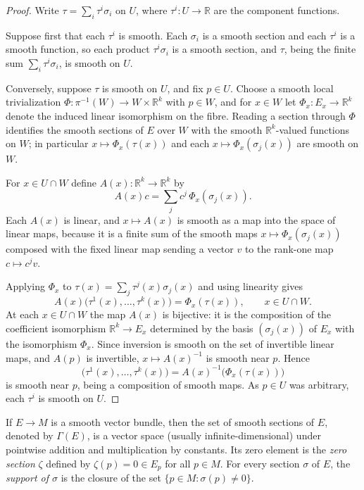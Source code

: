 \begin{proof}
\leanok
Write $\tau = \sum_i \tau^i \sigma_i$ on $U$, where $\tau^i : U \to \mathbb{R}$ are the component
functions.

Suppose first that each $\tau^i$ is smooth. Each $\sigma_i$ is a smooth section and each $\tau^i$
is a smooth function, so each product $\tau^i \sigma_i$ is a smooth section, and $\tau$, being the
finite sum $\sum_i \tau^i \sigma_i$, is smooth on $U$.

Conversely, suppose $\tau$ is smooth on $U$, and fix $p \in U$. Choose a smooth local
trivialization $\Phi : \pi^{-1}(W) \to W \times \mathbb{R}^k$ with $p \in W$, and for $x \in W$ let
$\Phi_x : E_x \to \mathbb{R}^k$ denote the induced linear isomorphism on the fibre. Reading a
section through $\Phi$ identifies the smooth sections of $E$ over $W$ with the smooth
$\mathbb{R}^k$-valued functions on $W$; in particular $x \mapsto \Phi_x(\tau(x))$ and each
$x \mapsto \Phi_x(\sigma_j(x))$ are smooth on $W$.

For $x \in U \cap W$ define $A(x) : \mathbb{R}^k \to \mathbb{R}^k$ by
\[
  A(x)c = \sum_j c^j \, \Phi_x(\sigma_j(x)).
\]
Each $A(x)$ is linear, and $x \mapsto A(x)$ is smooth as a map into the space of linear maps,
because it is a finite sum of the smooth maps $x \mapsto \Phi_x(\sigma_j(x))$ composed with the
fixed linear map sending a vector $v$ to the rank-one map $c \mapsto c^j v$.

Applying $\Phi_x$ to $\tau(x) = \sum_j \tau^j(x)\sigma_j(x)$ and using linearity gives
\[
  A(x)\bigl(\tau^1(x), \ldots, \tau^k(x)\bigr) = \Phi_x(\tau(x)), \qquad x \in U \cap W .
\]
At each $x \in U \cap W$ the map $A(x)$ is bijective: it is the composition of the coefficient
isomorphism $\mathbb{R}^k \to E_x$ determined by the basis $(\sigma_j(x))$ of $E_x$ with the
isomorphism $\Phi_x$. Since inversion is smooth on the set of invertible linear maps, and
$A(p)$ is invertible, $x \mapsto A(x)^{-1}$ is smooth near $p$. Hence
\[
  \bigl(\tau^1(x), \ldots, \tau^k(x)\bigr) = A(x)^{-1}\bigl(\Phi_x(\tau(x))\bigr)
\]
is smooth near $p$, being a composition of smooth maps. As $p \in U$ was arbitrary, each $\tau^i$
is smooth on $U$.
\end{proof}

If $E \to M$ is a smooth vector bundle, then the set of smooth sections of $E$, denoted by $\Gamma(E)$, is a vector space (usually infinite-dimensional) under pointwise addition and multiplication by constants. Its zero element is the \textit{zero section} $\zeta$ defined by $\zeta(p) = 0 \in E_p$ for all $p \in M$. For every section $\sigma$ of $E$, the \textit{support of $\sigma$} is the closure of the set $\{p \in M: \sigma(p) \neq 0\}$.

